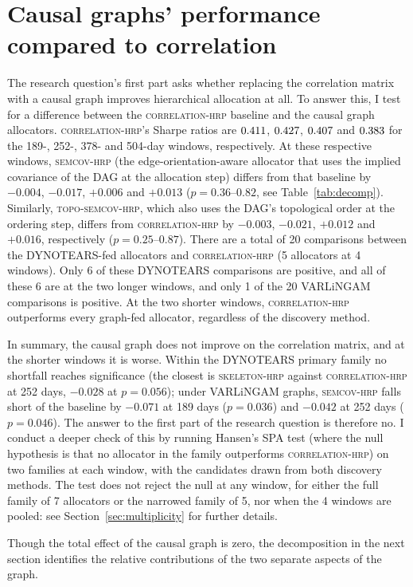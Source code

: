 \documentclass[11pt, a4paper]{report}
\newcommand{\corrhrp}{\textsc{correlation-hrp}}
\newcommand{\skelhrp}{\textsc{skeleton-hrp}}
\newcommand{\semcovhrp}{\textsc{semcov-hrp}}
\newcommand{\toposemcovhrp}{\textsc{topo-semcov-hrp}}
\begin{document}
\section{Causal graphs' performance compared to correlation}
\label{sec:graph-vs-correlation}

The research question's first part asks whether replacing the correlation matrix with a causal graph improves hierarchical allocation at all.
To answer this, I test for a difference between the \corrhrp{} baseline and the causal graph allocators.
\corrhrp{}'s Sharpe ratios are $0.411$,
$0.427$, $0.407$ and $0.383$ for the
189-, 252-, 378- and 504-day windows, respectively.
At these respective windows, \semcovhrp{} (the edge-orientation-aware allocator that uses the implied covariance of the DAG at the allocation step) differs from that baseline by $-0.004$, $-0.017$, $+0.006$ and $+0.013$ ($p=0.36$--$0.82$, see Table~\ref{tab:decomp}).
Similarly, \toposemcovhrp{}, which also uses the DAG's topological order at the ordering step, differs from \corrhrp{} by $-0.003$, $-0.021$, $+0.012$ and $+0.016$, respectively ($p=0.25$--$0.87$).
There are a total of 20 comparisons between the DYNOTEARS-fed
allocators and \corrhrp{} (5 allocators at 4 windows). Only 6 of these DYNOTEARS comparisons are positive, and all of these 6 are at the two longer windows, and only 1 of the 20 VARLiNGAM comparisons is positive.
At the two shorter windows, \corrhrp{} outperforms every graph-fed allocator, regardless of the discovery method.

In summary, the causal graph does not improve on the correlation matrix, and at the shorter windows it is worse. Within the DYNOTEARS primary family no shortfall reaches significance (the closest is \skelhrp{} against \corrhrp{} at 252 days, $-0.028$ at $p=0.056$); under VARLiNGAM graphs, \semcovhrp{} falls short of the baseline by $-0.071$ at 189 days ($p=0.036$) and $-0.042$ at 252 days ($p=0.046$). The answer to the first part of the research question is therefore no.
I conduct a deeper check of this by running Hansen's SPA test (where the
null hypothesis is that no allocator in the family outperforms
\corrhrp{}) on two families at each window, with the candidates
drawn from both discovery methods.
The test does not reject the null at any window, for
either the full family of 7 allocators or the narrowed family of 5, nor
when the 4 windows are pooled: see Section~\ref{sec:multiplicity} for further details.

Though the total effect of the causal graph is zero, the decomposition in the next section identifies the relative contributions of the two separate aspects of the graph.
\end{document}
